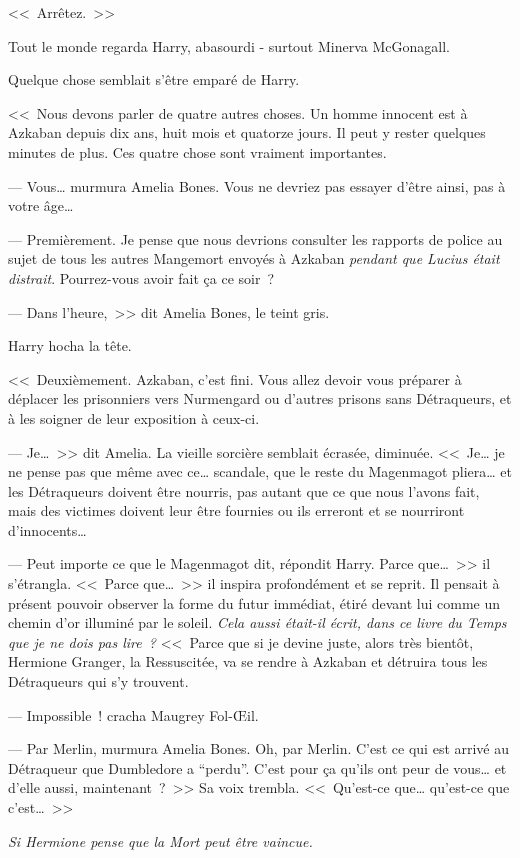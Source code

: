 <<~Arrêtez.~>>

Tout le monde regarda Harry, abasourdi - surtout Minerva McGonagall.

Quelque chose semblait s'être emparé de Harry.

<<~Nous devons parler de quatre autres choses. Un homme innocent est à Azkaban depuis dix ans, huit mois et quatorze jours. Il peut y rester quelques minutes de plus. Ces quatre chose sont vraiment importantes.

--- Vous… murmura Amelia Bones. Vous ne devriez pas essayer d'être ainsi, pas à votre âge…

--- Premièrement. Je pense que nous devrions consulter les rapports de police au sujet de tous les autres Mangemort envoyés à Azkaban \emph{pendant que Lucius était distrait}. Pourrez-vous avoir fait ça ce soir~?

--- Dans l'heure,~>> dit Amelia Bones, le teint gris.

Harry hocha la tête.

<<~Deuxièmement. Azkaban, c'est fini. Vous allez devoir vous préparer à déplacer les prisonniers vers Nurmengard ou d'autres prisons sans Détraqueurs, et à les soigner de leur exposition à ceux-ci.

--- Je…~>> dit Amelia. La vieille sorcière semblait écrasée, diminuée. <<~Je… je ne pense pas que même avec ce… scandale, que le reste du Magenmagot pliera… et les Détraqueurs doivent être nourris, pas autant que ce que nous l'avons fait, mais des victimes doivent leur être fournies ou ils erreront et se nourriront d'innocents…

--- Peut importe ce que le Magenmagot dit, répondit Harry. Parce que…~>> il s'étrangla. <<~Parce que…~>> il inspira profondément et se reprit. Il pensait à présent pouvoir observer la forme du futur immédiat, étiré devant lui comme un chemin d'or illuminé par le soleil. \emph{Cela aussi était-il écrit, dans ce livre du Temps que je ne dois pas lire~?} <<~Parce que si je devine juste, alors très bientôt, Hermione Granger, la Ressuscitée, va se rendre à Azkaban et détruira tous les Détraqueurs qui s'y trouvent.

--- Impossible~! cracha Maugrey Fol-Œil.

--- Par Merlin, murmura Amelia Bones. Oh, par Merlin. C'est ce qui est arrivé au Détraqueur que Dumbledore a “perdu”. C'est pour ça qu'ils ont peur de vous… et d'elle aussi, maintenant~?~>> Sa voix trembla. <<~Qu'est-ce que… qu'est-ce que c'est…~>>

\emph{Si Hermione pense que la Mort peut être vaincue.}

